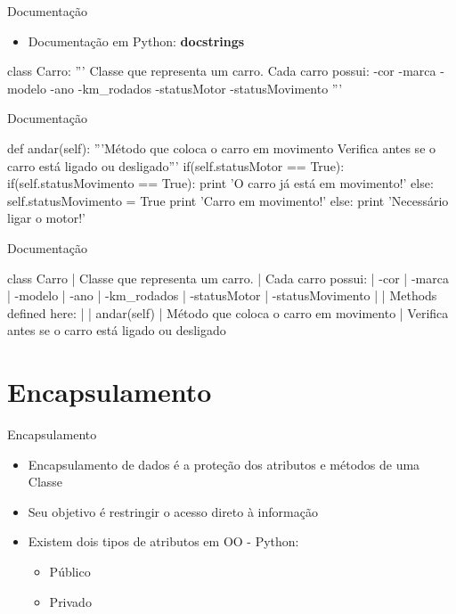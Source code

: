 \documentclass{beamer}
\begin{document}
\begin{frame}[fragile]{Documentação}
    \begin{itemize}
        \item Documentação em Python: \textbf{docstrings}
    \end{itemize}
    \small
    \begin{semiverbatim}
    class Carro:
        '''
        Classe que representa um carro. Cada carro possui:
            -cor
            -marca
            -modelo
            -ano
            -km_rodados
            -statusMotor
            -statusMovimento
        '''
    \end{semiverbatim}
\end{frame}

\begin{frame}[fragile]{Documentação}
    \small
    \begin{semiverbatim}
    def andar(self):
        '''Método que coloca o carro em movimento
        Verifica antes se o carro está ligado ou desligado'''
        if(self.statusMotor == True):
            if(self.statusMovimento == True):
                print 'O carro já está em movimento!'
            else:
                self.statusMovimento = True
                print 'Carro em movimento!'
        else:
            print 'Necessário ligar o motor!'
    \end{semiverbatim}
\end{frame}

\begin{frame}[fragile]{Documentação}
    \scriptsize
    \begin{semiverbatim}
    class Carro
        | Classe que representa um carro.
        | Cada carro possui:
        |   -cor
        |   -marca
        |   -modelo
        |   -ano
        |   -km_rodados
        |   -statusMotor
        |   -statusMovimento
        |
        | Methods defined here:
        |
        | andar(self)
        |   Método que coloca o carro em movimento
        |   Verifica antes se o carro está ligado ou desligado
    \end{semiverbatim}
\end{frame}

\section{Encapsulamento}

\begin{frame}{Encapsulamento}
    \begin{itemize}
        \item Encapsulamento de dados é a proteção dos atributos e métodos de uma Classe
        \item Seu objetivo é restringir o acesso direto à informação
        \item Existem dois tipos de atributos em OO - Python:
        \begin{itemize}
            \item Público
            \item Privado
        \end{itemize}
    \end{itemize}
\end{frame}
\end{document}
